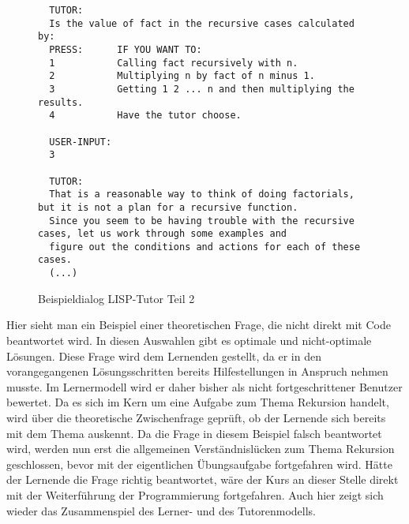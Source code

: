 
\begin{figure}[!ht]
\begin{lstlisting}
  TUTOR:
  Is the value of fact in the recursive cases calculated by:
  PRESS:      IF YOU WANT TO:
  1           Calling fact recursively with n.
  2           Multiplying n by fact of n minus 1.
  3           Getting 1 2 ... n and then multiplying the results.
  4           Have the tutor choose.

  USER-INPUT:
  3

  TUTOR:
  That is a reasonable way to think of doing factorials, but it is not a plan for a recursive function.
  Since you seem to be having trouble with the recursive cases, let us work through some examples and
  figure out the conditions and actions for each of these cases.
  (...)
\end{lstlisting}
\caption{Beispieldialog LISP-Tutor Teil 2}
\end{figure}

Hier sieht man ein Beispiel einer theoretischen Frage, die nicht direkt mit Code beantwortet wird.
In diesen Auswahlen gibt es optimale und nicht-optimale Lösungen.
Diese Frage wird dem Lernenden gestellt, da er in den vorangegangenen Lösungsschritten
bereits Hilfestellungen in Anspruch nehmen musste. Im Lernermodell wird er daher bisher als nicht
fortgeschrittener Benutzer bewertet. Da es sich im Kern um eine Aufgabe zum Thema Rekursion handelt,
wird über die theoretische Zwischenfrage geprüft, ob der Lernende sich bereits mit dem Thema auskennt.
Da die Frage in diesem Beispiel falsch beantwortet wird, werden nun erst die allgemeinen Verständnislücken
zum Thema Rekursion geschlossen, bevor mit der eigentlichen Übungsaufgabe fortgefahren wird.
Hätte der Lernende die Frage richtig beantwortet, wäre der Kurs an dieser Stelle direkt
mit der Weiterführung der Programmierung fortgefahren. Auch hier zeigt sich wieder das Zusammenspiel des Lerner- und des Tutorenmodells.





